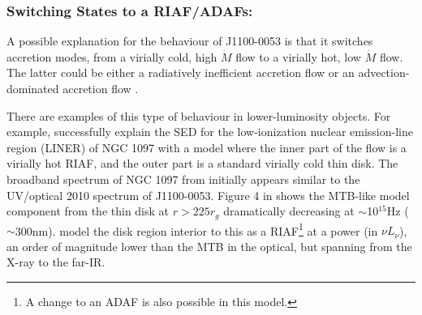 \documentclass[a4paper,fleqn,usenatbib]{mnras}
\begin{document}
\subsubsection{Switching States to a RIAF/ADAFs:}
A possible explanation for the behaviour of J1100-0053 is that it
switches accretion modes, from a virially cold, high $\dot{M}$ flow to
a virially hot, low $\dot{M}$ flow. The latter could be either a
radiatively inefficient accretion flow \citep[RIAF; ][]{Narayan1998,
Quataert2001} or an advection-dominated accretion flow \citep[ADAF;
][and references therein]{YuanNarayan2014}.

There are examples of this type of behaviour in lower-luminosity
objects.  For example, \citet{Nemmen2006} successfully explain the SED
for the low-ionization nuclear emission-line region (LINER) of NGC
1097 with a model where the inner part of the flow is a virially hot
RIAF, and the outer part is a standard virially cold thin disk. The
broadband spectrum of NGC 1097 from \citet{Nemmen2006} initially
appears similar to the UV/optical 2010 spectrum of J1100-0053.  Figure
4 in \citet{Nemmen2006} shows the MTB-like model component from the
thin disk at $r>225r_{g}$ dramatically decreasing at $\sim$10$^{15}$Hz
($\sim$300nm). \citet{Nemmen2006} model the disk region interior to
this as a RIAF\footnote{A change to an ADAF is also possible in this
model.} at a power (in $\nu L_{\nu}$), an order of magnitude lower
than the MTB in the optical, but spanning from the X-ray to the
far-IR.
\end{document}
